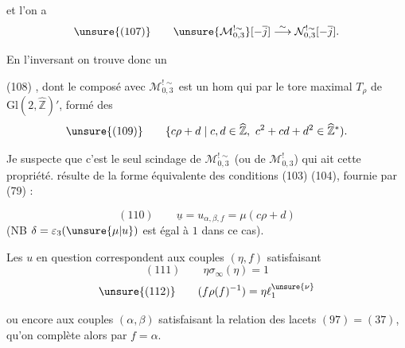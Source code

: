 
et l'on a
\[
 \unsure{(107)}\qquad
 \unsure{\mathcal M_{0,3}^{!\sim}}[-\overline{j}]
 \overset{\sim}{\longrightarrow}
 \mathcal N_{0,3}^{!\sim}[-\overline{j}].
\]

En l'inversant on trouve donc un

(108)
,
dont le composé avec $\mathcal M_{0,3}^{!\sim}$ est un hom qui
par le tore maximal $T_\rho$ de $\mathrm{Gl}(2,\widehat{\mathbb Z})'$,
formé des
\[
 \unsure{(109)}\qquad
 \{c\rho+d\mid c,d\in\widehat{\mathbb Z},\
 c^2+cd+d^2\in\widehat{\mathbb Z}^{*}).
\]

Je suspecte que c'est le seul scindage de
$\mathcal M_{0,3}^{!\sim}$
(ou  de $\mathcal M_{0,3}^{!}$)
qui ait cette propriété.  résulte de la forme équivalente
des conditions (103) (104), fournie par (79) :



\[
 (110)\qquad
 \underline{u}=u_{\alpha,\beta,f}=\mu(c\rho+d)
\]
(NB $\delta=\varepsilon_3(\unsure{\mu|u})$ est égal à $1$ dans ce cas).

Les $u$ en question correspondent aux couples $(\eta,f)$ satisfaisant
\[
 (111)\qquad \eta\sigma_\infty(\eta)=1
\]
\[
 \unsure{(112)}\qquad
 (f\rho(f)^{-1})=\eta\ell_1^{\unsure{\nu}}
\]



ou encore aux couples $(\alpha,\beta)$ satisfaisant la relation des lacets
$(97)=(37)$, qu'on complète alors par $f=\alpha$.

